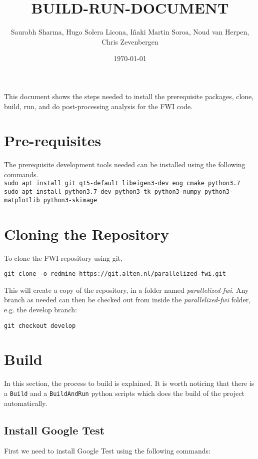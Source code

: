 \documentclass[10pt]{article}
\title{BUILD-RUN-DOCUMENT}
\author{Saurabh Sharma, Hugo Solera Licona, Iñaki Martin Soroa, Noud van Herpen, Chris Zevenbergen}
\date{\today}
\begin{document}
\maketitle
\noindent This document shows the steps needed to install the prerequisite packages, clone, build, run, and do post-processing analysis for the FWI code.

\section{Pre-requisites}
The prerequisite development tools needed can be installed using the following commands.\\

\noindent \texttt{sudo apt install git qt5-default libeigen3-dev eog cmake python3.7}\\
\texttt{sudo apt install python3.7-dev python3-tk python3-numpy python3-matplotlib python3-skimage}  


\section{Cloning the Repository}
\noindent To clone the FWI repository using git, 
\newline

\texttt{git clone -o redmine https://git.alten.nl/parallelized-fwi.git} 
\newline

This will create a copy of the repository, in a folder named \textit{parallelized-fwi}. Any branch as needed can then be checked out from inside the \textit{parallelized-fwi} folder, e.g. the develop branch: 
\newline

\texttt{git checkout develop}

\section{Build}
In this section, the process to build is explained. It is worth noticing that there is a \texttt{Build} and a \texttt{BuildAndRun} python scripts which does the build of the project automatically. 


\subsection{Install Google Test}
First we need to install Google Test using the following commands:
\newline
\end{document}
